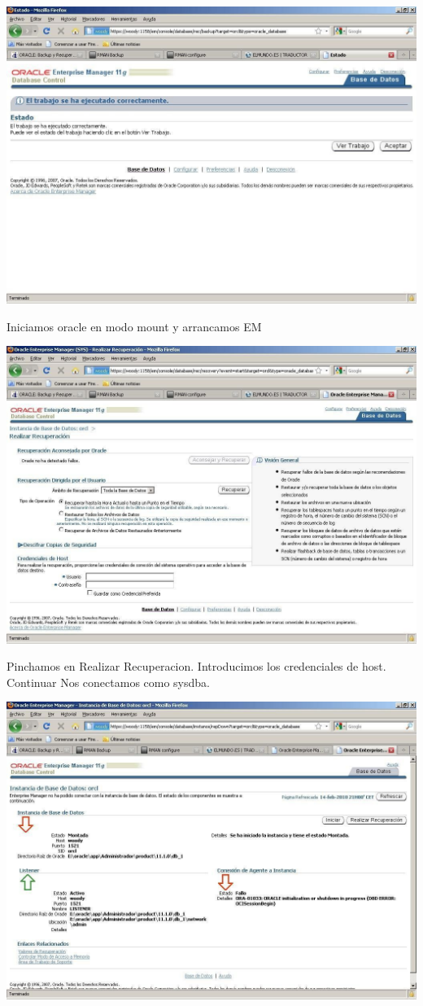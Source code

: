 \begin{enumerate}[1.]
\begin{center}
	\includegraphics[width=15cm]{./Imagenes/eje5}
	\end{center}
Iniciamos oracle en modo mount y arrancamos EM
	\begin{center}
	\includegraphics[width=15cm]{./Imagenes/eje6}
	\end{center}
	Pinchamos en Realizar Recuperacion. Introducimos los credenciales de host. Continuar Nos conectamos como sysdba.
	\begin{center}
	\includegraphics[width=15cm]{./Imagenes/eje7}

\end{center}
\end{enumerate}
